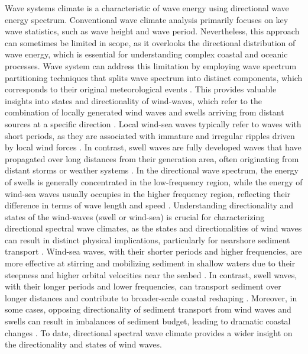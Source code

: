 Wave systems climate is a characteristic of wave energy using directional wave
energy spectrum. Conventional wave climate analysis primarily focuses on key
wave statistics, such as wave height and wave period. Nevertheless, this
approach can sometimes be limited in scope, as it overlooks the directional
distribution of wave energy, which is essential for understanding complex
coastal and oceanic processes. Wave system can address this limitation by
employing wave spectrum partitioning techniques that splits wave spectrum into
distinct components, which corresponds to their original meteorological events
\citep{jiang_wave_2019,portilla-yandun_wave_2015}. This provides valuable
insights into states and directionality of wind-waves, which refer to the
combination of locally generated wind waves and swells arriving from distant
sources at a specific direction \citep{han_directional_2022}. Local wind-sea
waves typically refer to waves with short periods, as they are associated with
immature and irregular ripples driven by local wind forces
\citep{hanson_wind_1999}.  In contrast, swell waves are fully developed waves
that have propagated over long distances from their generation area, often
originating from distant storms or weather systems \citep{alford_internal_2001}.
In the directional wave spectrum, the energy of swells is generally concentrated
in the low-frequency region, while the energy of wind-sea waves usually occupies
in the higher frequency region, reflecting their difference in terms of wave
length and speed \citep{george_nearshore_2020,vettor_global_2020}.
Understanding directionality and states of the wind-waves (swell or wind-sea) is
crucial for characterizing directional spectral wave climates, as the states and
directionalities of wind waves can result in distinct physical implications,
particularly for nearshore sediment transport \citep{george_nearshore_2020}.
Wind-sea waves, with their shorter periods and higher frequencies, are more
effective at stirring and mobilizing sediment in shallow waters due to their
steepness and higher orbital velocities near the seabed
\citep{boechat_albernaz_effects_2019,nabavianpour_experimental_2024}. In
contrast, swell waves, with their longer periods and lower frequencies, can
transport sediment over longer distances and contribute to broader-scale coastal
reshaping \citep{basaran_effect_2021}.  Moreover, in some cases, opposing
directionality of sediment transport from wind waves and swells can result in
imbalances of sediment budget, leading to dramatic coastal changes
\citep{hapke_review_2010}. To date, directional spectral wave climate provides a
wider insight on the directionality and states of wind waves.

